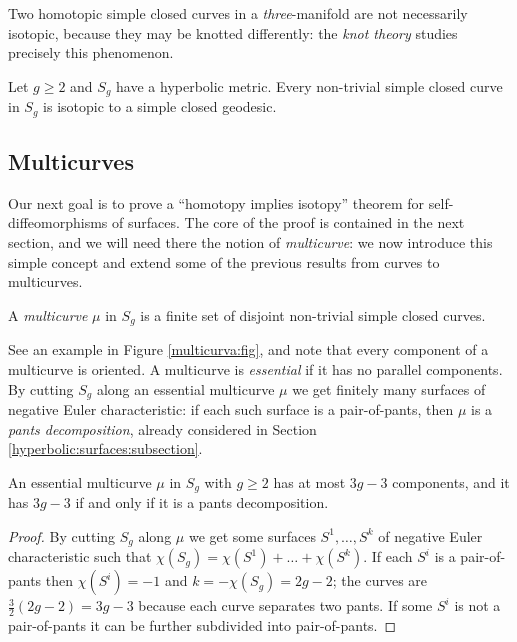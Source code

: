 \begin{warning}
Two homotopic simple closed curves in a \emph{three}-manifold are not necessarily isotopic, because they may be knotted differently: the \emph{knot theory} studies precisely this phenomenon.
\end{warning}

\begin{cor}
Let $g\geqslant 2$ and $S_g$ have a hyperbolic metric. Every non-trivial simple closed curve in $S_g$ is isotopic to a simple closed geodesic.
\end{cor}

\subsection{Multicurves}
Our next goal is to prove a ``homotopy implies isotopy'' theorem for self-diffeomorphisms of surfaces. The core of the proof is contained in the next section, and we will need there the notion of \emph{multicurve}: we now introduce this simple concept and extend some of the previous results from curves to multicurves. 

\begin{defn} A \emph{multicurve} $\mu$ in $S_g$ is a finite set of disjoint non-trivial simple closed curves.
\end{defn}
See an example in Figure \ref{multicurva:fig}, and note that every component of a multicurve is oriented. A multicurve is \emph{essential} if it has no parallel components. By cutting $S_g$ along an essential multicurve $\mu$ we get finitely many surfaces of negative Euler characteristic: if each such surface is a pair-of-pants, then $\mu$ is a \emph{pants decomposition}, already considered in Section \ref{hyperbolic:surfaces:subsection}.

\begin{prop} \label{parallele:prop}
An essential multicurve $\mu$ in $S_g$ with $g\geqslant 2$ has at most $3g-3$ components, and it has $3g-3$ if and only if it is a pants decomposition.
\end{prop}
\begin{proof}
By cutting $S_g$ along $\mu$ we get some surfaces $S^1,\ldots, S^k$ of negative Euler characteristic such that $\chi(S_g) = \chi(S^1)+\ldots +\chi(S^k)$. If each $S^i$ is a pair-of-pants then $\chi(S^i)=-1$ and $k=-\chi(S_g) = 2g-2$; the curves are $\frac 32(2g-2) = 3g-3$ because each curve separates two pants. If some $S^i$ is not a pair-of-pants it can be further subdivided into pair-of-pants.
\end{proof}

